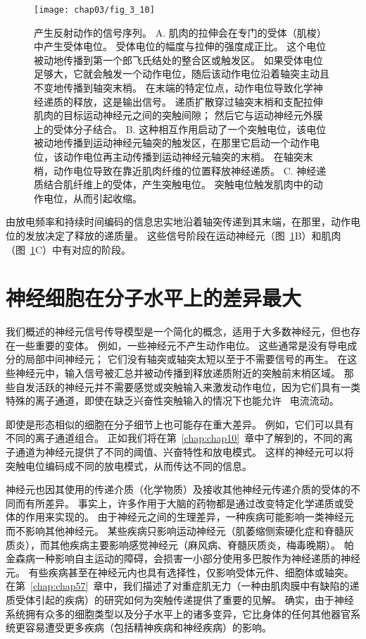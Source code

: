\begin{figure}[htbp]
	\centering
	\texttt{[image: chap03/fig\_3\_10]}
	\caption{产生反射动作的信号序列。
		A. 肌肉的拉伸会在专门的受体（肌梭）中产生受体电位。 
		受体电位的幅度与拉伸的强度成正比。 
		这个电位被动地传播到第一个郎飞氏结处的整合区或触发区。
		如果受体电位足够大，它就会触发一个动作电位，随后该动作电位沿着轴突主动且不变地传播到轴突末梢。
		在末端的特定位点，动作电位导致化学神经递质的释放，这是输出信号。
		递质扩散穿过轴突末梢和支配拉伸肌肉的目标运动神经元之间的突触间隙；
		然后它与运动神经元外膜上的受体分子结合。
		B. 这种相互作用启动了一个突触电位，该电位被动地传播到运动神经元轴突的触发区，在那里它启动一个动作电位，该动作电位再主动传播到运动神经元轴突的末梢。
		在轴突末梢，动作电位导致在靠近肌肉纤维的位置释放神经递质。
		C. 神经递质结合肌纤维上的受体，产生突触电位。
		突触电位触发肌肉中的动作电位，从而引起收缩。}
	\label{fig:3_10}
\end{figure}


由放电频率和持续时间编码的信息忠实地沿着轴突传递到其末端，在那里，动作电位的发放决定了释放的递质量。 
这些信号阶段在运动神经元（图~\ref{fig:3_10}B）和肌肉（图~\ref{fig:3_10}C）中有对应的阶段。


\section{神经细胞在分子水平上的差异最大}
我们概述的神经元信号传导模型是一个简化的概念，适用于大多数神经元，但也存在一些重要的变体。
例如，一些神经元不产生动作电位。 
这些通常是没有导电成分的局部中间神经元； 它们没有轴突或轴突太短以至于不需要信号的再生。 
在这些神经元中，输入信号被汇总并被动传播到释放递质附近的突触前末梢区域。 
那些自发活跃的神经元并不需要感觉或突触输入来激发动作电位，因为它们具有一类特殊的离子通道，即使在缺乏兴奋性突触输入的情况下也能允许~ 电流流动。


即使是形态相似的细胞在分子细节上也可能存在重大差异。
例如，它们可以具有不同的离子通道组合。
正如我们将在第~\ref{chap:chap10}~章中了解到的，不同的离子通道为神经元提供了不同的阈值、兴奋特性和放电模式。
这样的神经元可以将突触电位编码成不同的放电模式，从而传达不同的信息。


神经元也因其使用的传递介质（化学物质）及接收其他神经元传递介质的受体的不同而有所差异。
事实上，许多作用于大脑的药物都是通过改变特定化学递质或受体的作用来实现的。 
由于神经元之间的生理差异，一种疾病可能影响一类神经元而不影响其他神经元。 
某些疾病只影响运动神经元（肌萎缩侧索硬化症和脊髓灰质炎），而其他疾病主要影响感觉神经元（麻风病、脊髓灰质炎，梅毒晚期）。
帕金森病一种影响自主运动的障碍，会损害一小部分使用多巴胺作为神经递质的神经元。 
有些疾病甚至在神经元内也具有选择性，仅影响受体元件、细胞体或轴突。
在第~\ref{chap:chap57}~章中，我们描述了对重症肌无力（一种由肌肉膜中有缺陷的递质受体引起的疾病）的研究如何为突触传递提供了重要的见解。
确实，由于神经系统拥有众多的细胞类型以及分子水平上的诸多变异，它比身体的任何其他器官系统更容易遭受更多疾病（包括精神疾病和神经疾病）的影响。


